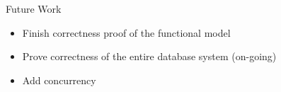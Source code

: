 \documentclass[usenames,dvipsnames]{beamer}
\begin{document}
\begin{frame}[fragile]
\begin{columns}[T]
\begin{column}{.23\textwidth}
\begin{block}{Future Work}
  \begin{itemize}
  \item Finish correctness proof of the functional model
  \item Prove correctness of the entire database system (on-going)
  \item Add concurrency
  \end{itemize}
\end{block}

\end{column}
\end{columns}

\end{frame}
\end{document}

